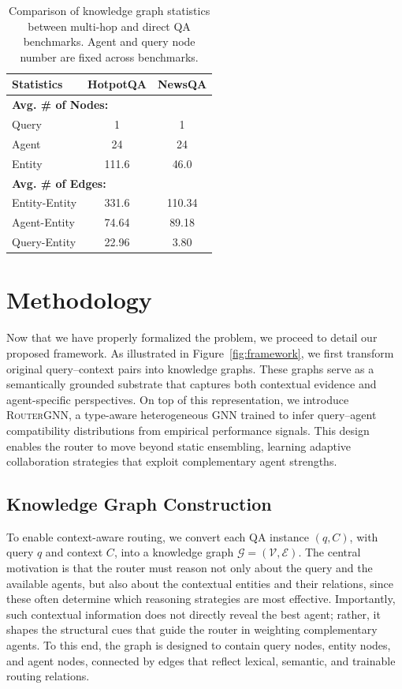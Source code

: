 \documentclass[11pt]{article}
\begin{document}
\begin{table}[t]
\centering
\begin{tabular}{lcc}
\toprule
\textbf{Statistics} & \textbf{HotpotQA} & \textbf{NewsQA} \\
\midrule\midrule
\multicolumn{3}{l}{\textbf{Avg. \# of Nodes:}} \\
\quad Query           & 1     & 1     \\
\quad Agent           & 24    & 24    \\
\quad Entity          & 111.6 & 46.0 \\
\midrule\midrule
\multicolumn{3}{l}{\textbf{Avg. \# of Edges:}} \\
\quad Entity-Entity            & 331.6 & 110.34  \\
\quad Agent-Entity        & 74.64  & 89.18  \\
\quad Query-Entity    & 22.96  & 3.80   \\
\bottomrule
\end{tabular}
\vspace{-5pt}
\caption{Comparison of knowledge graph statistics between multi-hop and direct QA benchmarks. Agent and query node number are fixed across benchmarks.}
\vspace{-15pt}
\label{tab:benchmark_stats}
\end{table}

\section{Methodology}

Now that we have properly formalized the problem, we proceed to detail our proposed framework. As illustrated in Figure~\ref{fig:framework}, we first transform original query–context pairs into knowledge graphs. These graphs serve as a semantically grounded substrate that captures both contextual evidence and agent-specific perspectives. On top of this representation, we introduce \textsc{RouterGNN}, a type-aware heterogeneous GNN trained to infer query–agent compatibility distributions from empirical performance signals. This design enables the router to move beyond static ensembling, learning adaptive collaboration strategies that exploit complementary agent strengths. 

\subsection{Knowledge Graph Construction}

To enable context-aware routing, we convert each QA instance $(q, C)$, with query $q$ and context $C$, into a knowledge graph $\mathcal{G}=(\mathcal{V},\mathcal{E})$. The central motivation is that the router must reason not only about the query and the available agents, but also about the contextual entities and their relations, since these often determine which reasoning strategies are most effective. Importantly, such contextual information does not directly reveal the best agent; rather, it shapes the structural cues that guide the router in weighting complementary agents. To this end, the graph is designed to contain query nodes, entity nodes, and agent nodes, connected by edges that reflect lexical, semantic, and trainable routing relations.
\end{document}
